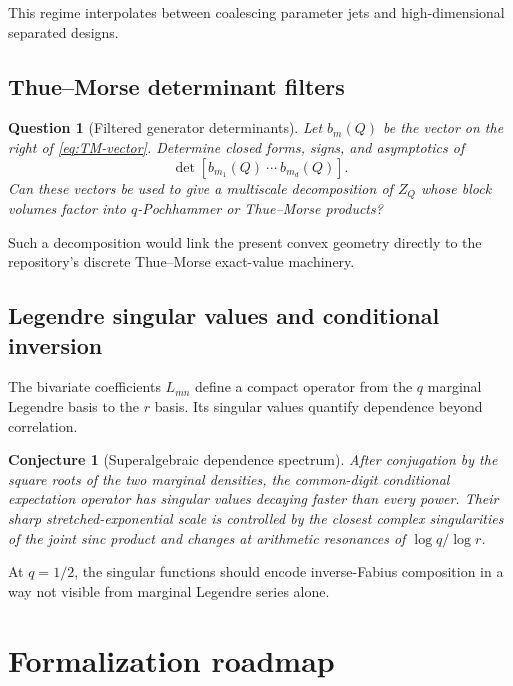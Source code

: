 \documentclass[11pt,a4paper]{article}
\newtheorem{conjecture}[theorem]{Conjecture}
\newtheorem{question}[theorem]{Question}
\theoremstyle{definition}
\theoremstyle{remark}
\begin{document}
This regime interpolates between coalescing parameter jets and high-dimensional separated designs.

\subsection{Thue--Morse determinant filters}

\begin{question}[Filtered generator determinants]
\label{question:TM-determinants}
Let $b_m(Q)$ be the vector on the right of \eqref{eq:TM-vector}.  Determine closed forms, signs, and asymptotics of
\begin{equation}
  \det[b_{m_1}(Q)\ \cdots\ b_{m_d}(Q)].
  \label{eq:TM-determinant-question}
\end{equation}
Can these vectors be used to give a multiscale decomposition of $Z_Q$ whose block volumes factor into $q$-Pochhammer or Thue--Morse products?
\end{question}

Such a decomposition would link the present convex geometry directly to the repository's discrete Thue--Morse exact-value machinery.

\subsection{Legendre singular values and conditional inversion}

The bivariate coefficients $L_{mn}$ define a compact operator from the $q$ marginal Legendre basis to the $r$ basis.  Its singular values quantify dependence beyond correlation.

\begin{conjecture}[Superalgebraic dependence spectrum]
\label{conj:legendre-spectrum}
After conjugation by the square roots of the two marginal densities, the common-digit conditional expectation operator has singular values decaying faster than every power.  Their sharp stretched-exponential scale is controlled by the closest complex singularities of the joint sinc product and changes at arithmetic resonances of $\log q/\log r$.
\end{conjecture}

At $q=1/2$, the singular functions should encode inverse-Fabius composition in a way not visible from marginal Legendre series alone.

\section{Formalization roadmap}
\label{sec:formalization}
\end{document}
